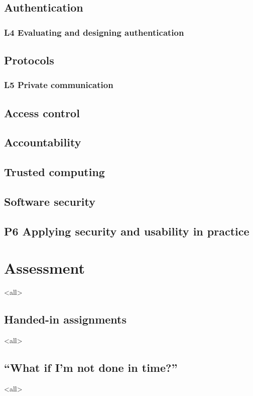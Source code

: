 {\subsection{Authentication}%
\label{authentication}


\subsubsection{L4 Evaluating and designing authentication}%
\label{pwdeval}


\subsection{Protocols}%
\label{protocols}


\subsubsection{L5 Private communication}%
\label{pricomlab}


\subsection{Access control}%
\label{ac}


\subsection{Accountability}%
\label{accountability}


\subsection{Trusted computing}%
\label{trustcomp}


\subsection{Software security}%
\label{software}


\subsection{P6 Applying security and usability in practice}%
\label{devel}

} %


\section{Assessment}%
\label{Assessment}
\mode<all>{}

\subsection{Handed-in assignments}
\mode<all>{}

\subsection{\enquote{What if I'm not done in time?}}%
\label{sec:late}
\mode<all>{}


\printbibliography
